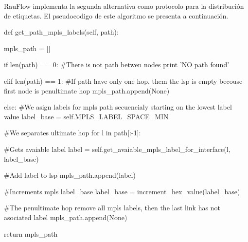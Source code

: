 RauFlow implementa la segunda alternativa como protocolo para la distribución de etiquetas. El pseudocodigo de este algoritmo se presenta a continuación.\\

\begin{python}
def get_path_mpls_labels(self, path):

    mpls_path = []

    if len(path) == 0:
        #There is not path betwen nodes
        print 'NO path found'

    elif len(path) == 1:
        #If path have only one hop, them the lsp is empty becouse first node is penultimate hop
        mpls_path.append(None)
        
    else:
        #We asign labels for mpls path secuencialy starting on the lowest label value
        label_base = self.MPLS_LABEL_SPACE_MIN
        
        #We separates ultimate hop
        for l in path[:-1]:
        	       
           	#Gets avaiable label
           	label = self.get_avaiable_mpls_label_for_interface(l, label_base)

          	#Add label to lsp
           	mpls_path.append(label)

           	#Increments mpls label_base
            label_base = increment_hex_value(label_base)

            #The penultimate hop remove all mpls labels, then the last link has not asociated label
            mpls_path.append(None)

    return mpls_path
\end{python}

